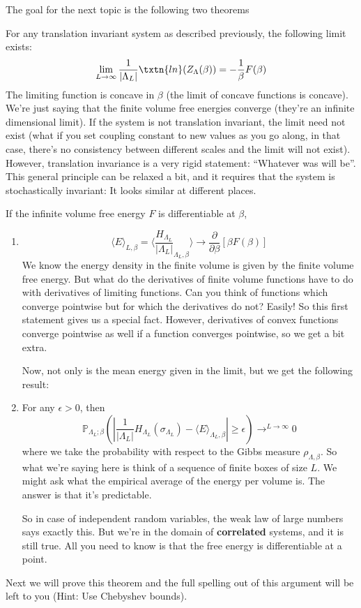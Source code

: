 The goal for the next topic is the following two theorems

\begin{thm} 
For any translation invariant system as described previously, the following limit exists: 
\[
\lim_{L \to \infty} \frac{1}{|\Lambda_L|} \txtn{ln}(Z_{\Lambda}(\beta)) = -\frac{1}{\beta}F(\beta)
\]
The limiting function is concave in $\beta$ (the limit of concave functions is concave). 
We're just saying that the finite volume free energies converge (they're an infinite dimensional limit). 
If the system is not translation invariant, the limit need not exist (what if you set coupling constant to new values as you go along, in that case, there's no consistency between different scales and the limit will not exist). 
However, translation invariance is a very rigid statement: ``Whatever was will be''. This general principle can be relaxed a bit, and it requires that the system is stochastically invariant: It looks similar at different places. 
\end{thm}

\begin{thm}
If the infinite volume free energy $F$ is differentiable at $\beta$,
\begin{enumerate}

\item 
\[
\langle E \rangle_{L, \beta} = \langle \frac{H_{\Lambda_L}}{|\Lambda_L|}_{\Lambda_L, \beta} \rangle \to \frac{\partial}{\partial \beta} \left[\beta F(\beta)\right]
\]
We know the energy density in the finite volume is given by the finite volume free energy. But what do the derivatives of finite volume functions have to do with derivatives of limiting functions. Can you think of functions which converge pointwise but for which the derivatives do not? Easily! So this first statement gives us a special fact. However, derivatives of convex functions converge pointwise as well if a function converges pointwise, so we get a bit extra. 

Now, not only is the mean energy given in the limit, but we get the following result: 

\item For any $\epsilon > 0$, then 
\[
\mathbb{P}_{\Lambda_L; \beta}\left(\left|\frac{1}{|\Lambda_L|}H_{\Lambda_L}(\sigma_{\Lambda_L}) - \langle E \rangle_{\Lambda_L, \beta} \right| \geq \epsilon \right) \to^{L \to \infty} 0
\]
where we take the probability with respect to the Gibbs measure $\rho_{\Lambda, \beta}$. 
So what we're saying here is think of a sequence of finite boxes of size $L$. We might ask what the empirical average of the energy per volume is. The answer is that it's predictable. 

So in case of independent random variables, the weak law of large numbers says exactly this. But we're in the domain of \textbf{correlated} systems, and it is still true. All you need to know is that the free energy is differentiable at a point. 
\end{enumerate}
\end{thm}

Next we will prove this theorem and the full spelling out of this argument will be left to you (Hint: Use Chebyshev bounds). 







